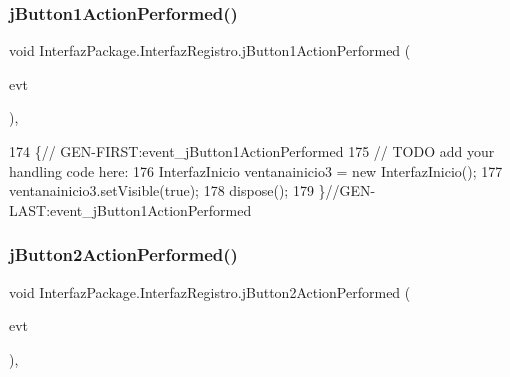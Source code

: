 \mbox{\label{class_interfaz_package_1_1_interfaz_registro_affdd5c6917bc792ac5956b859af09413}} 
\subsubsection{\texorpdfstring{j\+Button1\+Action\+Performed()}{jButton1ActionPerformed()}}
{\footnotesize\ttfamily void Interfaz\+Package.\+Interfaz\+Registro.\+j\+Button1\+Action\+Performed (\begin{DoxyParamCaption}\item[{java.\+awt.\+event.\+Action\+Event}]{evt }\end{DoxyParamCaption})\hspace{0.3cm}{\ttfamily [inline]}, {\ttfamily [private]}}


\begin{DoxyCode}
174                                                                          \{\textcolor{comment}{//
      GEN-FIRST:event\_jButton1ActionPerformed}
175         \textcolor{comment}{// TODO add your handling code here:}
176         InterfazInicio ventanainicio3 = \textcolor{keyword}{new} InterfazInicio();
177         ventanainicio3.setVisible(\textcolor{keyword}{true});
178         dispose();
179     \}\textcolor{comment}{//GEN-LAST:event\_jButton1ActionPerformed}
\end{DoxyCode}
\mbox{\label{class_interfaz_package_1_1_interfaz_registro_a030f9895f8648d5c1c85dd7b97ea84fb}} 
\subsubsection{\texorpdfstring{j\+Button2\+Action\+Performed()}{jButton2ActionPerformed()}}
{\footnotesize\ttfamily void Interfaz\+Package.\+Interfaz\+Registro.\+j\+Button2\+Action\+Performed (\begin{DoxyParamCaption}\item[{java.\+awt.\+event.\+Action\+Event}]{evt }\end{DoxyParamCaption})\hspace{0.3cm}{\ttfamily [inline]}, {\ttfamily [private]}}


